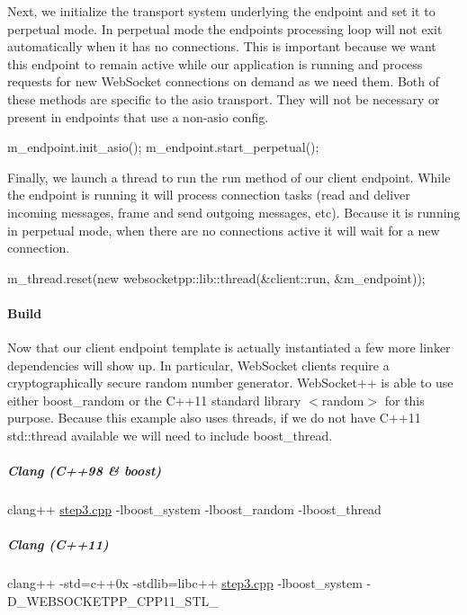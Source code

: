 Next, we initialize the transport system underlying the endpoint and set it to perpetual mode. In perpetual mode the endpoint\textquotesingle{}s processing loop will not exit automatically when it has no connections. This is important because we want this endpoint to remain active while our application is running and process requests for new Web\+Socket connections on demand as we need them. Both of these methods are specific to the asio transport. They will not be necessary or present in endpoints that use a non-\/asio config. 
\begin{DoxyCode}
m\_endpoint.init\_asio();
m\_endpoint.start\_perpetual();
\end{DoxyCode}


Finally, we launch a thread to run the {\ttfamily run} method of our client endpoint. While the endpoint is running it will process connection tasks (read and deliver incoming messages, frame and send outgoing messages, etc). Because it is running in perpetual mode, when there are no connections active it will wait for a new connection. 
\begin{DoxyCode}
m\_thread.reset(\textcolor{keyword}{new} websocketpp::lib::thread(&client::run, &m\_endpoint));
\end{DoxyCode}


\paragraph*{Build}

Now that our client endpoint template is actually instantiated a few more linker dependencies will show up. In particular, Web\+Socket clients require a cryptographically secure random number generator. Web\+Socket++ is able to use either {\ttfamily boost\+\_\+random} or the C++11 standard library $<$random$>$ for this purpose. Because this example also uses threads, if we do not have C++11 std\+::thread available we will need to include {\ttfamily boost\+\_\+thread}.

\subparagraph*{Clang (C++98 \& boost)}

{\ttfamily clang++ \hyperlink{step3_8cpp_source}{step3.\+cpp} -\/lboost\+\_\+system -\/lboost\+\_\+random -\/lboost\+\_\+thread}

\subparagraph*{Clang (C++11)}

{\ttfamily clang++ -\/std=c++0x -\/stdlib=libc++ \hyperlink{step3_8cpp_source}{step3.\+cpp} -\/lboost\+\_\+system -\/\+D\+\_\+\+W\+E\+B\+S\+O\+C\+K\+E\+T\+P\+P\+\_\+\+C\+P\+P11\+\_\+\+S\+T\+L\+\_\+}

